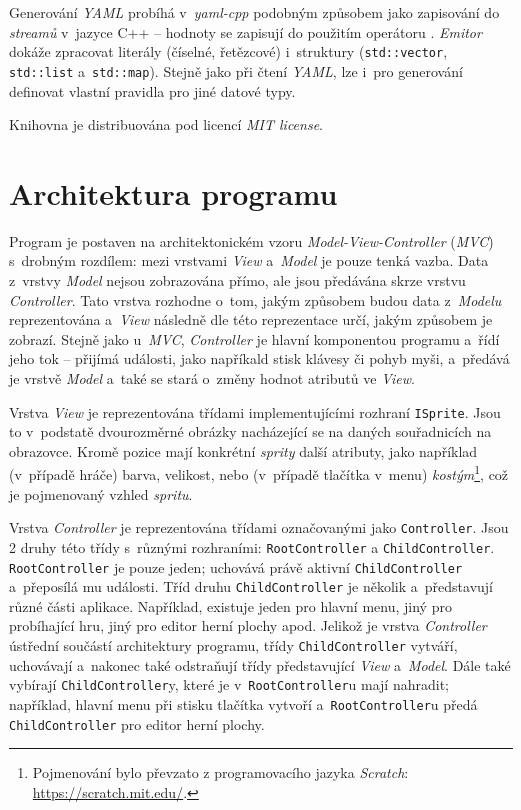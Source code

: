 Generování \emph{YAML} probíhá v~\emph{yaml-cpp} podobným způsobem jako zapisování do \emph{streamů} v~jazyce C++ -- hodnoty se zapisují do  použitím operátoru \uv{\texttt{<{}<}}. \emph{Emitor} dokáže zpracovat literály (číselné, řetězcové) i~struktury (\texttt{std::vector}, \texttt{std::list} a~\texttt{std::map}). Stejně jako při čtení \emph{YAML}, lze i~pro generování definovat vlastní pravidla pro jiné datové typy.

Knihovna je distribuována pod licencí \emph{MIT license}.


\section{Architektura programu}

Program je postaven na architektonickém vzoru \emph{Model-View-Controller} (\emph{MVC}) s~drobným rozdílem: mezi vrstvami \emph{View} a~\emph{Model} je pouze tenká vazba. Data z~vrstvy \emph{Model} nejsou zobrazována přímo, ale jsou předávána skrze vrstvu \emph{Controller}. Tato vrstva rozhodne o~tom, jakým způsobem budou data z~\emph{Modelu} reprezentována a~\emph{View} následně dle této reprezentace určí, jakým způsobem je zobrazí. Stejně jako u~\emph{MVC}, \emph{Controller} je hlavní komponentou programu a~řídí jeho tok -- přijímá události, jako napříkald stisk klávesy či pohyb myši, a~předává je vrstvě \emph{Model} a~také se stará o~změny hodnot atributů ve \emph{View}.

Vrstva \emph{View} je reprezentována třídami implementujícími rozhraní \texttt{ISprite}. Jsou to v~podstatě dvourozměrné obrázky nacházející se na daných souřadnicích na obrazovce. Kromě pozice mají konkrétní \emph{sprity} další atributy, jako například (v~případě hráče) barva, velikost, nebo (v~případě tlačítka v~menu) \emph{kostým}\footnote{Pojmenování  bylo převzato z programovacího jazyka \emph{Scratch}: \url{https://scratch.mit.edu/}.}, což je pojmenovaný vzhled \emph{spritu}.

Vrstva \emph{Controller} je reprezentována třídami označovanými jako \texttt{Controller}. Jsou 2 druhy této třídy s~různými rozhraními: \texttt{RootController} a \texttt{ChildController}. \texttt{Root\-Con\-trol\-ler} je pouze jeden; uchovává právě aktivní \texttt{ChildController} a~přeposílá mu události. Tříd druhu \texttt{ChildController} je několik a~představují různé části aplikace. Například, existuje jeden pro hlavní menu, jiný pro probíhající hru, jiný pro editor herní plochy apod. Jelikož je vrstva \emph{Controller} ústřední součástí architektury programu, třídy \texttt{ChildController} vytváří, uchovávají a~nakonec také odstraňují třídy představující \emph{View} a~\emph{Model}. Dále také vybírají \texttt{ChildController}y, které je v~\texttt{RootController}u mají nahradit; například, hlavní menu při stisku tlačítka vytvoří a~\texttt{RootController}u předá \texttt{ChildController} pro editor herní plochy.

